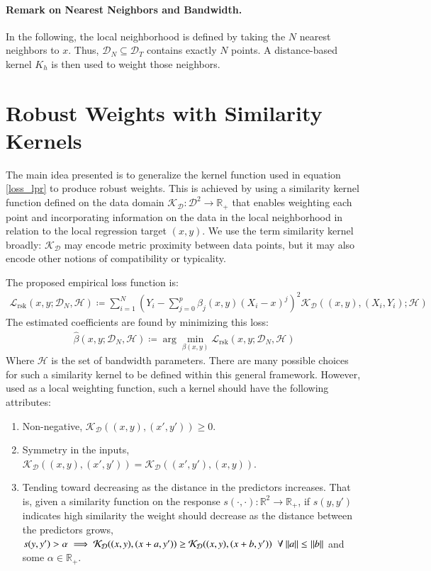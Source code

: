 \documentclass[preprint,1p,times,authoryear]{elsarticle}
\begin{document}
\paragraph{Remark on Nearest Neighbors and Bandwidth.}
In the following, the local neighborhood is defined by taking the \(N\) nearest neighbors to \(x\). Thus, \(\mathcal{D}_N \subseteq \mathcal{D}_T\) contains exactly \(N\) points. A distance-based kernel \(K_h\) is then used to weight those neighbors.

\section{Robust Weights with Similarity Kernels}
\label{S:Robust Weights with Similarity kernels}
The main idea presented is to generalize the kernel function used in equation \eqref{loss_lpr} to produce robust weights. This is achieved by using a similarity kernel function defined on the data domain $\mathcal{K}_{\mathcal{D}}:\mathcal{D}^2 \rightarrow \mathbb{R}_+$ that enables weighting each point and incorporating information on the data in the local neighborhood in relation to the local regression target $(x,y)$.
We use the term similarity kernel broadly: \(\mathcal K_{\mathcal D}\) may encode metric proximity between data points, but it may also encode other notions of compatibility or typicality.

The proposed empirical loss function is:
\begin{align}
\mathcal{L}_{\text{rsk}}(x, y; \mathcal{D}_N , \mathcal{H}) \coloneqq \sum_{i=1}^N \left(  Y_i - \sum_{j=0}^p \beta_j (x, y) (X_i - x)^j \right)^2 \mathcal{K}_{\mathcal{D}} \left((x,y),(X_i, Y_i); \mathcal{H} \right)
\label{loss_rsk}
\end{align}
The estimated coefficients are found by minimizing this loss:
\begin{align}
\hat{\beta}(x,y ; \mathcal{D}_N, \mathcal{H} ) \coloneqq \arg\min_{\beta(x,y)} \mathcal{L}_{\text{rsk}}(x, y; \mathcal{D}_N , \mathcal{H}) 
\label{beta_loss_d}
\end{align}
Where $\mathcal{H}$ is the set of bandwidth parameters. There are many possible choices for such a similarity kernel to be defined within this general framework. However, used as a local weighting function, such a kernel should have the following attributes:
\begin{enumerate}
\item Non-negative, $\mathcal{K}_{\mathcal{D}}((x,y) , ( x', y')) \geq 0$.
\item Symmetry in the inputs, $\mathcal{K}_{\mathcal{D}}((x,y) , ( x', y')) = \mathcal{K}_{\mathcal{D}}((x', y') , (x,y))$.
\item Tending toward decreasing as the distance in the predictors increases. That is, given  a similarity function on the response $s(\cdot, \cdot): \mathbb{R}^2 \rightarrow \mathbb{R}_+$, if $s(y, y')$ indicates high similarity the weight should decrease as the distance between the predictors grows, $s(y, y') > \alpha \implies      
\mathcal{K}_{\mathcal{D}}((x, y) , ( x + a, y')) \geq \mathcal{K}_{\mathcal{D}}((x, y) , (x + b, y')) \; \; \forall \: \norm{a} \leq \: \norm{b}$ and some $\alpha \in \mathbb{R}_+$.
\end{enumerate}
\end{document}
